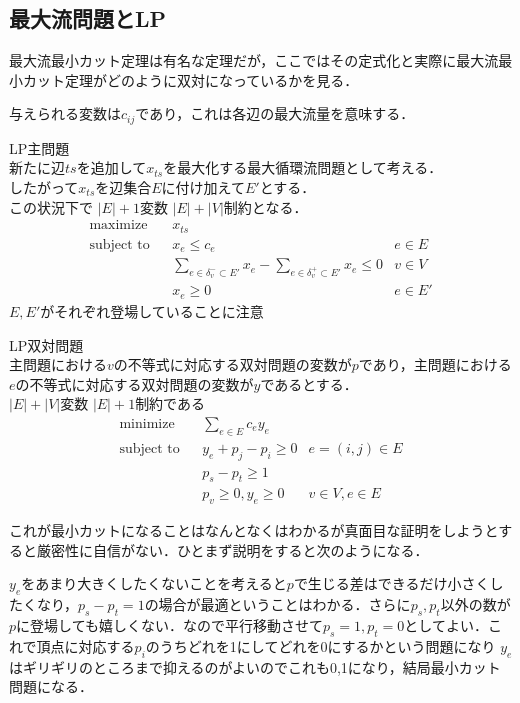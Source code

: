 \documentclass[13pt, a4paper, landscape]{jarticle}
\theoremstyle{nonitalic} %
\begin{document}
\subsection{最大流問題とLP}
最大流最小カット定理は有名な定理だが，ここではその定式化と実際に最大流最小カット定理がどのように双対になっているかを見る．

与えられる変数は$c_{ij}$であり，これは各辺の最大流量を意味する．

LP主問題 \\
新たに辺$ts$を追加して$x_{ts}$を最大化する最大循環流問題として考える． \\
したがって$x_{ts}$を辺集合$E$に付け加えて$E'$とする．\\
この状況下で $|E|+1$変数 $|E|+|V|$制約となる．
\begin{align}
 &&&&&\textrm{maximize}   && x_{ts}  \\
 &&&&&\textrm{subject to} && x_e\leq c_e & e \in E  &&&&&\\
 &&&&&                    && \sum_{e \in \delta_v^- \subset E'} x_e - \sum_{e \in \delta_v^+  \subset E'} x_e \leq 0 & v \in V &&&&& \\
 &&&&&                    && x_e \geq 0 & e \in E' &&&&&
\end{align}
$E, E'$がそれぞれ登場していることに注意


LP双対問題 \\
主問題における$v$の不等式に対応する双対問題の変数が$p$であり，主問題における$e$の不等式に対応する双対問題の変数が$y$であるとする．\\
$|E|+|V|$変数 $|E|+1$制約である
\begin{align}
 &&&&&\textrm{minimize}   && \sum_{e \in E} c_e y_e  \\
 &&&&&\textrm{subject to} && y_e + p_j - p_i \geq 0 &  e = (i, j) \in E  &&&&&\\
 &&&&&                    && p_s - p_t  \geq 1         &&&&& \\
 &&&&&                    && p_v \geq 0,  y_e \geq 0 &  v \in V, e \in E &&&&&
\end{align}

これが最小カットになることはなんとなくはわかるが真面目な証明をしようとすると厳密性に自信がない．ひとまず説明をすると次のようになる．

$y_e$をあまり大きくしたくないことを考えると$p$で生じる差はできるだけ小さくしたくなり，$p_s-p_t=1$の場合が最適ということはわかる．さらに$p_s, p_t$以外の数が$p$に登場しても嬉しくない．なので平行移動させて$p_s=1, p_t=0$としてよい．これで頂点に対応する$p_i$のうちどれを1にしてどれを0にするかという問題になり $y_e$ はギリギリのところまで抑えるのがよいのでこれも0,1になり，結局最小カット問題になる．
\end{document}
